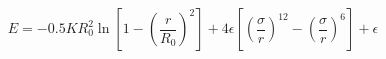 \documentclass[12pt]{article}
\begin{document}
$$ 
  E = -0.5 K R_0^2  \ln \left[ 1 - \left(\frac{r}{R_0}\right)^2\right] +
  4 \epsilon \left[ \left(\frac{\sigma}{r}\right)^{12} - 
    \left(\frac{\sigma}{r}\right)^6 \right] + \epsilon
$$
\end{document}
